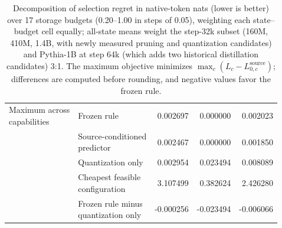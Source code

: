 \begin{table}[!htbp]
\begin{tabular*}{\textwidth}{@{\extracolsep{\fill}}llrrr@{}}
\addlinespace
\shortstack[l]{Maximum across\\capabilities} & Frozen rule & 0.002697 & 0.000000 & 0.002023 \\
 & \shortstack[l]{Source-conditioned\\predictor} & 0.002467 & 0.000000 & 0.001850 \\
 & Quantization only & 0.002954 & 0.023494 & 0.008089 \\
 & \shortstack[l]{Cheapest feasible\\configuration} & 3.107499 & 0.382624 & 2.426280 \\
 & \shortstack[l]{Frozen rule minus\\quantization only} & -0.000256 & -0.023494 & -0.006066 \\
\bottomrule
\end{tabular*}
\caption{Decomposition of selection regret in native-token nats (lower is better) over 17 storage budgets (0.20--1.00 in steps of 0.05), weighting each state--budget cell equally; all-state means weight the step-32k subset (160M, 410M, 1.4B, with newly measured pruning and quantization candidates) and Pythia-1B at step 64k (which adds two historical distillation candidates) 3:1. The maximum objective minimizes $\max_c(L_c-L_{0,c}^{\mathrm{source}})$; differences are computed before rounding, and negative values favor the frozen rule.}
\label{tab:rule_decomp}
\end{table}
